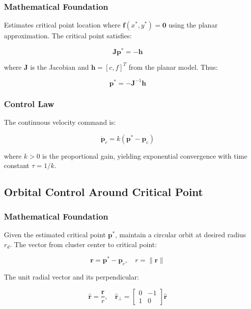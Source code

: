 \documentclass{article}
\begin{document}
\subsubsection{Mathematical Foundation}

Estimates critical point location where $\mathbf{f}(x^*, y^*) = \mathbf{0}$ using the planar approximation. The critical point satisfies:

\begin{equation}
\mathbf{J}\mathbf{p}^* = -\mathbf{h}
\end{equation}

where $\mathbf{J}$ is the Jacobian and $\mathbf{h} = [c, f]^T$ from the planar model. Thus:

\begin{equation}
\mathbf{p}^* = -\mathbf{J}^{-1}\mathbf{h}
\end{equation}

\subsubsection{Control Law}

The continuous velocity command is:

\begin{equation}
\dot{\mathbf{p}}_c = k(\mathbf{p}^* - \mathbf{p}_c)
\end{equation}

where $k > 0$ is the proportional gain, yielding exponential convergence with time constant $\tau = 1/k$.

\subsection{Orbital Control Around Critical Point}

\subsubsection{Mathematical Foundation}

Given the estimated critical point $\mathbf{p}^*$, maintain a circular orbit at desired radius $r_d$. The vector from cluster center to critical point:

\begin{equation}
\mathbf{r} = \mathbf{p}^* - \mathbf{p}_c, \quad r = \|\mathbf{r}\|
\end{equation}

The unit radial vector and its perpendicular:

\begin{equation}
\hat{\mathbf{r}} = \frac{\mathbf{r}}{r}, \quad \hat{\mathbf{r}}_\perp = \begin{bmatrix} 0 & -1 \\ 1 & 0 \end{bmatrix} \hat{\mathbf{r}}
\end{equation}
\end{document}
